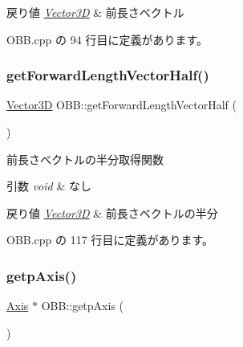 \begin{DoxyRetVals}{戻り値}
{\em \mbox{\hyperlink{class_vector3_d}{Vector3D}}} & 前長さベクトル \\
\hline
\end{DoxyRetVals}


 O\+B\+B.\+cpp の 94 行目に定義があります。

\mbox{\label{class_o_b_b_a08f76bee35b5b5bac44432ccc9571b33}} 
\subsubsection{\texorpdfstring{get\+Forward\+Length\+Vector\+Half()}{getForwardLengthVectorHalf()}}
{\footnotesize\ttfamily \mbox{\hyperlink{class_vector3_d}{Vector3D}} O\+B\+B\+::get\+Forward\+Length\+Vector\+Half (\begin{DoxyParamCaption}{ }\end{DoxyParamCaption})}



前長さベクトルの半分取得関数 


\begin{DoxyParams}{引数}
{\em void} & なし \\
\hline
\end{DoxyParams}

\begin{DoxyRetVals}{戻り値}
{\em \mbox{\hyperlink{class_vector3_d}{Vector3D}}} & 前長さベクトルの半分 \\
\hline
\end{DoxyRetVals}


 O\+B\+B.\+cpp の 117 行目に定義があります。

\mbox{\label{class_o_b_b_a4a9ca4f8a93f761eef0b75709a8903a2}} 
\subsubsection{\texorpdfstring{getp\+Axis()}{getpAxis()}}
{\footnotesize\ttfamily \mbox{\hyperlink{class_axis}{Axis}} $\ast$ O\+B\+B\+::getp\+Axis (\begin{DoxyParamCaption}{ }\end{DoxyParamCaption})}



